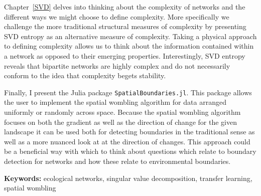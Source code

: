 \documentclass[12pt,oneside,phd]{dms}
\numberwithin{equation}{section}
\numberwithin{table}{chapter}
\numberwithin{figure}{chapter}
\begin{document}
Chapter~\ref{SVD} delves into thinking about the complexity of networks and the different ways we might choose to define complexity. More specifically we challenge the more traditional structural measures of complexity by presenting SVD entropy as an alternative measure of complexity. Taking a physical approach to defining complexity allows us to think about the information contained within a network as opposed to their emerging properties. Interestingly, SVD entropy reveals that bipartite networks are highly complex and do not necessarily conform to the idea that complexity begets stability. 

Finally, I present the Julia package \texttt{SpatialBoundaries.jl}. This package allows the user to implement the spatial wombling algorithm for data arranged uniformly or randomly across space. Because the spatial wombling algorithm focuses on both the gradient as well as the direction of change for the given landscape it can be used both for detecting boundaries in the traditional sense as well as a more nuanced look at at the direction of changes. This approach could be a beneficial way with which to think about questions which relate to boundary detection for networks and how these relate to environmental boundaries.

\textbf{Keywords:} ecological networks, singular value decomposition, transfer learning, spatial wombling



\anglais
\cleardoublepage
{}  %
\tableofcontents
\cleardoublepage
{}  %
\listoftables
\cleardoublepage
{}
\listoffigures
\end{document}
